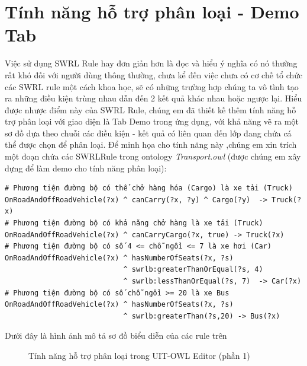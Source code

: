 \section{Tính năng hỗ trợ phân loại - Demo Tab}
Việc sử dụng SWRL Rule hay đơn giản hơn là đọc và hiểu ý nghĩa có nó thường rất khó đối với người dùng thông thường, chưa kể đến việc chưa có cơ chế tổ chức các SWRL rule một cách khoa học, sẽ có những trường hợp chúng ta vô tình tạo ra những điều kiện trùng nhau dẫn đến 2 kết quả khác nhau hoặc ngược lại. Hiểu được nhược điểm này của SWRL Rule, chúng em đã thiết kế thêm tính năng hỗ trợ phân loại với giao diện là Tab Demo trong ứng dụng, với khả năng vẽ ra một sơ đồ dựa theo chuỗi các điều kiện - kết quả có liên quan đến lớp đang chứa cá thể được chọn để phân loại. Để minh họa cho tính năng này ,chúng em xin trích một đoạn chứa các SWRLRule trong ontology \textit{Transport.owl} \cite{owleditorSrc} (được chúng em xây dựng để làm demo cho tính năng phân loại):
\begin{verbatim}
# Phương tiện đường bộ có thể chở hàng hóa (Cargo) là xe tải (Truck)
OnRoadAndOffRoadVehicle(?x) ^ canCarry(?x, ?y) ^ Cargo(?y)  -> Truck(?x)
# Phương tiện đường bộ có khả năng chở hàng là xe tải (Truck)
OnRoadAndOffRoadVehicle(?x) ^ canCarryCargo(?x, true) -> Truck(?x)
# Phương tiện đường bộ có số 4 <= chỗ ngồi <= 7 là xe hơi (Car)
OnRoadAndOffRoadVehicle(?x) ^ hasNumberOfSeats(?x, ?s)
                            ^ swrlb:greaterThanOrEqual(?s, 4) 
                            ^ swrlb:lessThanOrEqual(?s, 7)  -> Car(?x)
# Phương tiện đường bộ có số chỗ ngồi >= 20 là xe Bus 
OnRoadAndOffRoadVehicle(?x) ^ hasNumberOfSeats(?x, ?s) 
                            ^ swrlb:greaterThan(?s,20) -> Bus(?x)                               
\end{verbatim}
Dưới đây là hình ảnh mô tả sơ đồ biểu diễn của các rule trên
\begin{figure}[h!]
	\centering
	\caption{Tính năng hỗ trợ phân loại trong UIT-OWL Editor (phần 1)\label{overflow}}
\end{figure}
